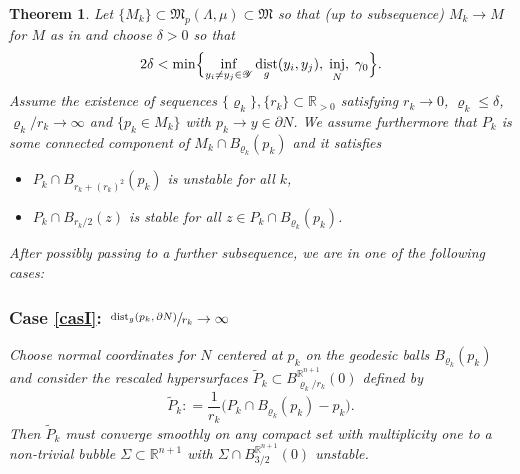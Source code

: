 \documentclass[JEP,XML,SOM,Unicode]{cedram}
\let\mathcal\mathscr
\newcounter{cas}
\DeclareMathOperator{\dist}{dist}
\DeclareMathOperator{\inj}{inj}
\newtheorem{thm}{Theorem}
\theoremstyle{definition}
\newcommand{\R}{\mathbb{R}}
\begin{document}
\begin{thm}\label{thm:blowup}
Let $\{M_k\}\subset \mathfrak{M}_p(\Lambda, \mu) \subset \mathfrak{M}$ so that (up to subsequence) $M_k\to M$ for $M$ as in \cite[Th.\,29]{ACS17} and choose $\delta>0$ so that
\begin{equation*}
2\delta<\min\Bigl\{\inf_{ y_i\neq y_j\in \mathcal{Y}} \dist_g(y_i,y_j),\; \inj_N,\; \gamma_0 \Bigr\}.
\end{equation*} Assume the existence of sequences $\{\varrho_k\},\{r_k\}\subset \R_{>0}$ satisfying $r_k\to 0$, $\varrho_k\leq \delta$, $\varrho_k/r_k\to \infty$ and $\{p_k\in M_k\}$ with $p_k\to y\in \partial N$. We assume furthermore that $P_k$ is some connected component of $M_k\cap B_{\varrho_k}(p_k)$ and it satisfies
\begin{itemize}
\item $P_k\cap B_{r_k + (r_k)^2}(p_k)$ is unstable for all $k$,
\item $P_k\cap B_{r_k/2}(z)$ is stable for all $z\in P_k\cap B_{\varrho_k}(p_k)$.
\end{itemize}

After possibly passing to a further subsequence, we are in one of the following cases: 

\vspace*{-.3\baselineskip}
\subsubsection*{\label{casI}Case \ref{casI}: $\sfrac{\dist_g(p_k,\partial N)}{r_k}\to\infty$} Choose normal coordinates for $N$ centered at $p_k$ on the geodesic balls $B_{\varrho_k}(p_k)$ and consider the rescaled hypersurfaces $\widetilde{P}_k \subset B^{\R^{n+1}}_{\varrho_k/r_k}(0)$ defined by
\begin{equation*}
\widetilde{P}_k : = \frac{1}{r_k} \big(P_k\cap B_{\varrho_k}(p_k)- p_k\big).
\end{equation*} Then $\widetilde{P}_k$ must converge smoothly on any compact set with multiplicity one to a non-trivial bubble $\Sigma\subset \R^{n+1}$ with $\Sigma\cap B^{\R^{n+1}}_{3/2}(0)$ unstable. 

\vspace*{-.3\baselineskip}

\end{thm}
\end{document}
